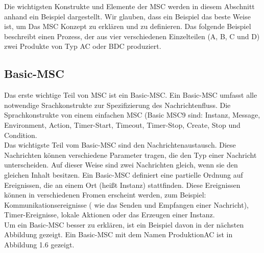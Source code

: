 Die wichtigsten Konstrukte und Elemente der MSC werden in diesem Abschnitt anhand ein Beispiel dargestellt. Wir glauben, dass ein Beispiel das beste Weise ist, um Das MSC Konzept zu erklären und zu definieren. 
Das folgende Beispiel beschreibt einen Prozess, der aus vier verschiedenen Einzelteilen (A, B, C und D) zwei Produkte von Typ AC oder BDC produziert. 


\subsection{Basic-MSC}
Das erste wichtige Teil von MSC ist ein Basic-MSC. Ein Basic-MSC umfasst alle notwendige Srachkonstrukte zur Spezifizierung des Nachrichtenfluss.
Die Sprachkonstrukte von einem einfachen MSC (Basic MSC9 sind: Instanz, Message, Environment, Action, Timer-Start, Timeout, Timer-Stop, Create, Stop und Condition. \\
Das wichtigste Teil vom Basic-MSC sind den Nachrichtenaustausch. Diese Nachrichten können verschiedene Parameter tragen, die den Typ einer Nachricht unterscheiden. Auf dieser Weise sind zwei Nachrichten gleich, wenn sie den gleichen Inhalt besitzen.
Ein Basic-MSC definiert eine partielle Ordnung auf Ereignissen, die an einem Ort (heißt Instanz) stattfinden.
Diese Ereignissen können in verschiedenen Fromen erscheint werden, zum Beispiel: Kommunikationsereignisse ( wie das Senden und Empfangen einer Nachricht), Timer-Ereignisse, lokale Aktionen oder das Erzeugen einer Instanz.\\
Um ein Basic-MSC besser zu erklären, ist ein Beispiel davon in der nächsten Abbildung gezeigt.
Ein Basic-MSC mit dem Namen ProduktionAC ist in
Abbildung 1.6 gezeigt.
